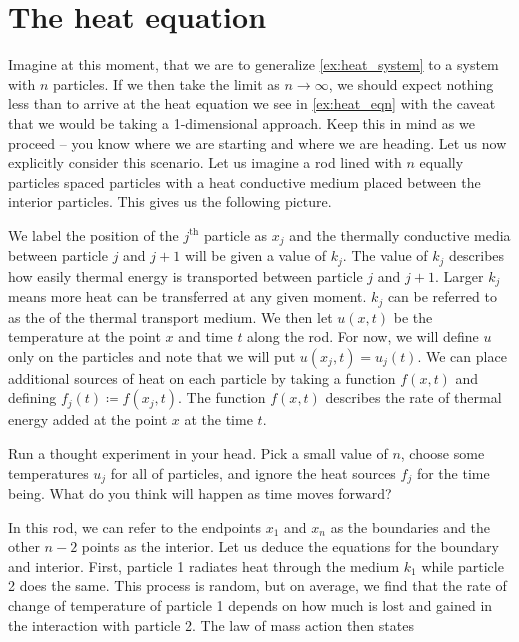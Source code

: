     
    
        \section{The heat equation}
        
        Imagine at this moment, that we are to generalize \cref{ex:heat_system} to a system with $n$ particles. If we then take the limit as $n \to \infty$, we should expect nothing less than to arrive at the heat equation we see in \cref{ex:heat_eqn} with the caveat that we would be taking a 1-dimensional approach. Keep this in mind as we proceed -- you know where we are starting and where we are heading. Let us now explicitly consider this scenario. Let us imagine a rod lined with $n$ equally particles spaced particles with a heat conductive medium placed between the interior particles. This gives us the following picture.
\begin{figure}[H]
	\centering
	\resizebox{\columnwidth}{!}{}
\end{figure}
        We label the position of the $j^\textrm{th}$ particle as $x_j$ and the thermally conductive media between particle $j$ and $j+1$ will be given a value of $k_j$. The value of $k_j$ describes how easily thermal energy is transported between particle $j$ and $j+1$. Larger $k_j$ means more heat can be transferred at any given moment. $k_j$ can be referred to as the  of the thermal transport medium. We then let $u(x,t)$ be the temperature at the point $x$ and time $t$ along the rod. For now, we will define $u$ only on the particles and note that we will put $u(x_j,t)=u_j(t)$. We can place additional sources of heat on each particle by taking a function $f(x,t)$ and defining $f_j(t) \coloneqq f(x_j,t)$. The function $f(x,t)$ describes the rate of thermal energy added at the point $x$ at the time $t$.
    \begin{exercise}
    Run a thought experiment in your head. Pick a small value of $n$, choose some temperatures $u_j$ for all of particles, and ignore the heat sources $f_j$ for the time being. What do you think will happen as time moves forward?
    \end{exercise} 
        In this rod, we can refer to the endpoints $x_1$ and $x_n$ as the boundaries and the other $n-2$ points as the interior. Let us deduce the equations for the boundary and interior. First, particle 1 radiates heat through the medium $k_1$ while particle 2 does the same. This process is random, but on average, we find that the rate of change of temperature of particle 1 depends on how much is lost and gained in the interaction with particle 2. The law of mass action then states
